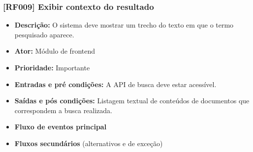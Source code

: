   \subsubsection{[RF009] Exibir contexto do resultado}
\begin{itemize}
   \item \textbf{Descrição:} O sistema deve mostrar um trecho do texto em que o termo pesquisado aparece.
   \item \textbf{Ator:} Módulo de frontend
   \item \textbf{Prioridade:} Importante
   \item \textbf{Entradas e pré condições:} A API de busca deve estar acessível.
   \item \textbf{Saídas e pós condições:} Listagem textual de conteúdos de documentos que correspondem a busca realizada.
   \item \textbf{Fluxo de eventos principal}
   \item \textbf{Fluxos secundários} (alternativos e de exceção)
 \end{itemize}

